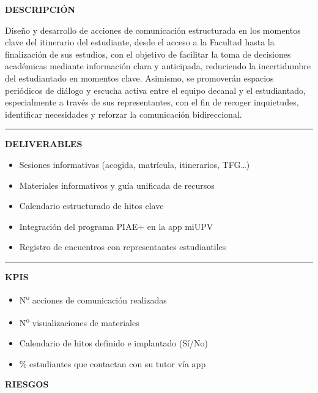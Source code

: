 \documentclass[11pt,a4paper]{scrreprt}
\newcommand{\fieldlabel}[1]{%
  {\footnotesize\sffamily\bfseries\color{mutedcolor}\MakeUppercase{#1}}\par\nopagebreak[4]
}
\newcommand{\fieldsep}{\vspace{3pt}\noindent\textcolor{bordercolor}{\rule{\linewidth}{0.4pt}}\vspace{3pt}\par}
\begin{document}
\begin{tcolorbox}[pabox={e360color}{PA1.2 \enspace\textbullet\enspace Desarrollo de acciones de comunicación en momentos clave del itinerario del estudiante}]

\fieldlabel{Descripci\'on}
{\small Diseño y desarrollo de acciones de comunicación estructurada en los momentos clave del itinerario del estudiante, desde el acceso a la Facultad hasta la finalización de sus estudios, con el objetivo de facilitar la toma de decisiones académicas mediante información clara y anticipada, reduciendo la incertidumbre del estudiantado en momentos clave. Asimismo, se promoverán espacios periódicos de diálogo y escucha activa entre el equipo decanal y el estudiantado, especialmente a través de sus representantes, con el fin de recoger inquietudes, identificar necesidades y reforzar la comunicación bidireccional.}\par
\fieldsep
\fieldlabel{Deliverables}
{\small \begin{itemize}[noitemsep,topsep=2pt]
\item Sesiones informativas (acogida, matrícula, itinerarios, TFG…)
\item Materiales informativos y guía unificada de recursos
\item Calendario estructurado de hitos clave
\item Integración del programa PIAE+ en la app miUPV
\item Registro de encuentros con representantes estudiantiles
\end{itemize}}\par
\fieldsep
\fieldlabel{KPIs}
{\small \begin{itemize}[noitemsep,topsep=2pt]
\item N\textsuperscript{o} acciones de comunicación realizadas
\item N\textsuperscript{o} visualizaciones de materiales
\item Calendario de hitos definido e implantado (Sí/No)
\item \% estudiantes que contactan con su tutor vía app
\end{itemize}}\par
\end{tcolorbox}
\begin{tcolorbox}[riskbox]
{\footnotesize\sffamily\bfseries\color{red!50!black} RIESGOS}\par{}
\end{tcolorbox}
\end{document}
